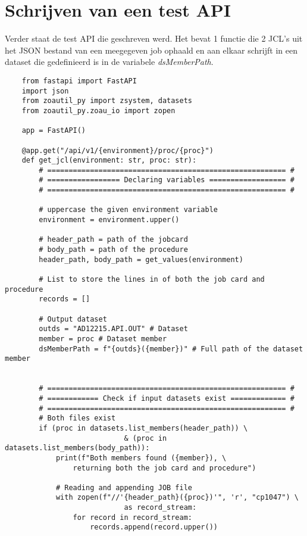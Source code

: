 \section{Schrijven van een test API}
Verder staat de test API die geschreven werd. Het bevat 1 functie die 2 JCL's uit het JSON bestand van een meegegeven job ophaald en aan elkaar schrijft in een dataset die gedefinieerd is in de variabele \textit{dsMemberPath}. 
\begin{lstlisting}
    from fastapi import FastAPI
    import json
    from zoautil_py import zsystem, datasets
    from zoautil_py.zoau_io import zopen
    
    app = FastAPI()
    
    @app.get("/api/v1/{environment}/proc/{proc}")
    def get_jcl(environment: str, proc: str):
        # ======================================================== #
        # ================= Declaring variables ================== #
        # ======================================================== #
        
        # uppercase the given environment variable
        environment = environment.upper()
        
        # header_path = path of the jobcard
        # body_path = path of the procedure
        header_path, body_path = get_values(environment)
        
        # List to store the lines in of both the job card and procedure
        records = []
        
        # Output dataset
        outds = "AD12215.API.OUT" # Dataset
        member = proc # Dataset member
        dsMemberPath = f"{outds}({member})" # Full path of the dataset member
        
        
        # ======================================================== #
        # ============ Check if input datasets exist ============= #
        # ======================================================== #
        # Both files exist
        if (proc in datasets.list_members(header_path)) \
                            & (proc in datasets.list_members(body_path)):
            print(f"Both members found ({member}), \
                returning both the job card and procedure")
        
            # Reading and appending JOB file
            with zopen(f"//'{header_path}({proc})'", 'r', "cp1047") \
                            as record_stream:
                for record in record_stream:
                    records.append(record.upper())
        

\end{lstlisting}
